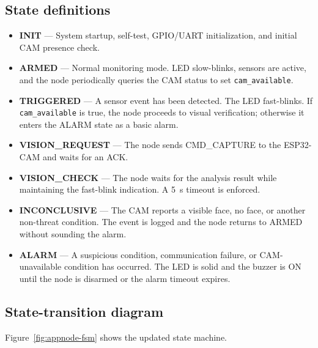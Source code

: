 \documentclass[11pt,a4paper]{article}
\begin{document}
\subsection{State definitions}

\begin{itemize}
    \item \textbf{INIT} --- System startup, self-test, GPIO/UART initialization, and initial CAM presence check.
    \item \textbf{ARMED} --- Normal monitoring mode.  LED slow-blinks, sensors are active, and the node periodically queries the CAM status to set \texttt{cam\_available}.
    \item \textbf{TRIGGERED} --- A sensor event has been detected.  The LED fast-blinks.  If \texttt{cam\_available} is true, the node proceeds to visual verification; otherwise it enters the ALARM state as a basic alarm.
    \item \textbf{VISION\_REQUEST} --- The node sends CMD\_CAPTURE to the ESP32-CAM and waits for an ACK.
    \item \textbf{VISION\_CHECK} --- The node waits for the analysis result while maintaining the fast-blink indication.  A 5~s timeout is enforced.
    \item \textbf{INCONCLUSIVE} --- The CAM reports a visible face, no face, or another non-threat condition.  The event is logged and the node returns to ARMED without sounding the alarm.
    \item \textbf{ALARM} --- A suspicious condition, communication failure, or CAM-unavailable condition has occurred.  The LED is solid and the buzzer is ON until the node is disarmed or the alarm timeout expires.
\end{itemize}

\subsection{State-transition diagram}

Figure~\ref{fig:appnode-fsm} shows the updated state machine.
\end{document}
